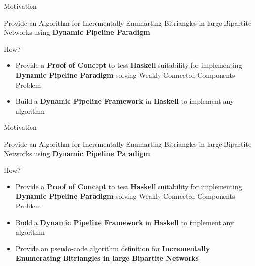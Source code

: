 \begin{frame}[fragile]{Motivation}
  \begin{center}
    Provide an Algorithm for Incrementally Enumarting Bitriangles in large Bipartite Networks using \textbf{Dynamic Pipeline Paradigm}
  \end{center}    
  \begin{block}{How?}
    \begin{itemize}
      \item {\color{light}Provide a \textbf{Proof of Concept} to test \textbf{Haskell} suitability for implementing  \textbf{Dynamic Pipeline Paradigm} solving Weakly Connected Components Problem}
      \item Build a \textbf{Dynamic Pipeline Framework} in \textbf{Haskell} to implement any algorithm 
  \end{itemize}   
\end{block} 
\end{frame}

\begin{frame}[fragile]{Motivation}
  \begin{center}
    Provide an Algorithm for Incrementally Enumarting Bitriangles in large Bipartite Networks using \textbf{Dynamic Pipeline Paradigm}
  \end{center}    
  \begin{block}{How?}
    \begin{itemize}
      \item {\color{light}Provide a \textbf{Proof of Concept} to test \textbf{Haskell} suitability for implementing  \textbf{Dynamic Pipeline Paradigm} solving Weakly Connected Components Problem}
      \item {\color{light}Build a \textbf{Dynamic Pipeline Framework} in \textbf{Haskell} to implement any algorithm }
      \item Provide an pseudo-code algorithm definition for \textbf{Incrementally Enumerating Bitriangles in large Bipartite Networks}
  \end{itemize}   
\end{block} 
\end{frame}

